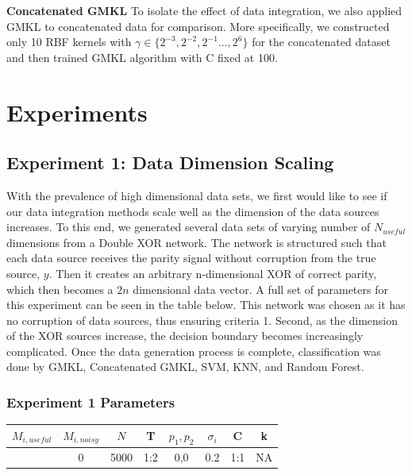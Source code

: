 \documentclass{article}
\begin{document}
\textbf{Concatenated GMKL}
To isolate the effect of data integration, we also applied GMKL to concatenated
data for comparison. More specifically, we constructed only 10 RBF kernels with
$\gamma \in \{2^{-3}, 2^{-2}, 2^{-1} ..., 2^{6}\}$ for the concatenated dataset
and then trained GMKL algorithm with C fixed at 100.\\













\section*{Experiments}



\subsection*{Experiment 1: Data Dimension Scaling}
With the prevalence of high dimensional data sets, we first would like to see
if our data integration methods scale well as the dimension of the data sources
increases. To this end, we generated several data sets of varying number of
$N_{useful}$ dimensions from a Double XOR network. The network is
structured such that each data source receives the parity signal without
corruption from the true source, $y$. Then it creates an arbitrary n-dimensional
XOR of correct parity, which then becomes a $2n$ dimensional data vector.  A full
set of parameters for this experiment can be seen in the table below. This network was
chosen as it has no corruption of data sources, thus ensuring criteria 1.
Second, as the dimension of the XOR sources increase, the decision boundary becomes
increasingly complicated. Once the data generation process is complete,
classification was done by GMKL, Concatenated GMKL, SVM, KNN, and Random
Forest.

\subsubsection*{Experiment 1 Parameters}
\begin{center}
\begin{tabular}{|c|c|c|c|c|c|c|c|}
\hline
$M_{i,useful}$ & $M_{i, noisy}$ & $N$ & T &  $p_1, p_2$ & $\sigma_i$ & C &  k  \\
\hline
[2,3,4,5,6,7] & 0 & 5000 & 1:2 & 0,0 & 0.2 & 1:1 & NA  \\
\hline
\end{tabular}
\end{center}
\end{document}
